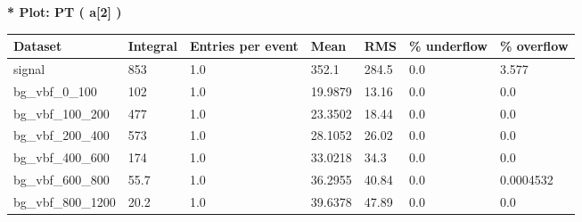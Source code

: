 \documentclass[a4paper, 10pt]{article}
\begin{document}
\textbf{* Plot: PT ( a[2] ) }\\
   \begin{table}[H]
  \begin{center}
    \begin{tabular}{|m{23.0mm}|m{23.0mm}|m{18.0mm}|m{19.0mm}|m{19.0mm}|m{19.0mm}|m{19.0mm}|}
      \hline
      {\cellcolor{yellow}         Dataset}& {\cellcolor{yellow}         Integral}& {\cellcolor{yellow}         Entries per event}& {\cellcolor{yellow}         Mean}& {\cellcolor{yellow}         RMS}& {\cellcolor{yellow}         \% underflow}& {\cellcolor{yellow}         \% overflow}\\
      \hline
      {\cellcolor{white}         signal}& {\cellcolor{white}         853}& {\cellcolor{white}         1.0}& {\cellcolor{white}         352.1}& {\cellcolor{white}         284.5}& {\cellcolor{green}         0.0}& {\cellcolor{green}         3.577}\\
      \hline
      {\cellcolor{white}         bg\_vbf\_0\_100}& {\cellcolor{white}         102}& {\cellcolor{white}         1.0}& {\cellcolor{white}         19.9879}& {\cellcolor{white}         13.16}& {\cellcolor{green}         0.0}& {\cellcolor{green}         0.0}\\
      \hline
      {\cellcolor{white}         bg\_vbf\_100\_200}& {\cellcolor{white}         477}& {\cellcolor{white}         1.0}& {\cellcolor{white}         23.3502}& {\cellcolor{white}         18.44}& {\cellcolor{green}         0.0}& {\cellcolor{green}         0.0}\\
      \hline
      {\cellcolor{white}         bg\_vbf\_200\_400}& {\cellcolor{white}         573}& {\cellcolor{white}         1.0}& {\cellcolor{white}         28.1052}& {\cellcolor{white}         26.02}& {\cellcolor{green}         0.0}& {\cellcolor{green}         0.0}\\
      \hline
      {\cellcolor{white}         bg\_vbf\_400\_600}& {\cellcolor{white}         174}& {\cellcolor{white}         1.0}& {\cellcolor{white}         33.0218}& {\cellcolor{white}         34.3}& {\cellcolor{green}         0.0}& {\cellcolor{green}         0.0}\\
      \hline
      {\cellcolor{white}         bg\_vbf\_600\_800}& {\cellcolor{white}         55.7}& {\cellcolor{white}         1.0}& {\cellcolor{white}         36.2955}& {\cellcolor{white}         40.84}& {\cellcolor{green}         0.0}& {\cellcolor{green}         0.0004532}\\
      \hline
      {\cellcolor{white}         bg\_vbf\_800\_1200}& {\cellcolor{white}         20.2}& {\cellcolor{white}         1.0}& {\cellcolor{white}         39.6378}& {\cellcolor{white}         47.89}& {\cellcolor{green}         0.0}& {\cellcolor{green}         0.0}\\

\end{tabular}
\end{center}
\end{table}
\end{document}
